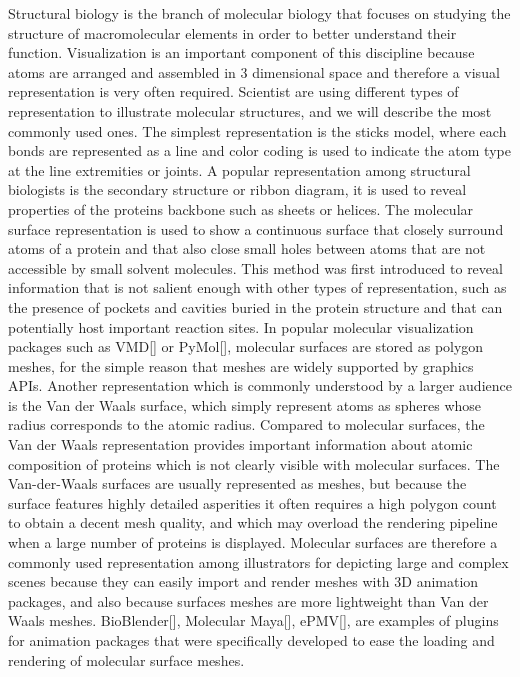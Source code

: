 Structural biology is the branch of molecular biology that focuses on studying the structure of macromolecular elements in order to better understand their function.
Visualization is an important component of this discipline because atoms are arranged and assembled in 3 dimensional space and therefore a visual representation is very often required.
Scientist are using different types of representation to illustrate molecular structures, and we will describe the most commonly used ones.
The simplest representation is the sticks model, where each bonds are represented as a line and color coding is used to indicate the atom type at the line extremities or joints.
A popular representation among structural biologists is the secondary structure or ribbon diagram, it is used to reveal properties of the proteins backbone such as sheets or helices.
The molecular surface representation is used to show a continuous surface that closely surround atoms of a protein and that also close small holes between atoms that are not accessible by small solvent molecules.
This method was first introduced to reveal information that is not salient enough with other types of representation, such as the presence of pockets and cavities buried in the protein structure and that can potentially host important reaction sites.
In popular molecular visualization packages such as VMD[] or PyMol[], molecular surfaces are stored as polygon meshes, for the simple reason that meshes are widely supported by graphics APIs.
Another representation which is commonly understood by a larger audience is the Van der Waals surface, which simply represent atoms as spheres whose radius corresponds to the atomic radius.
Compared to molecular surfaces, the Van der Waals representation provides important information about atomic composition of proteins which is not clearly visible with molecular surfaces.
The Van-der-Waals surfaces are usually represented as meshes, but because the surface features highly detailed asperities it often requires a high polygon count to obtain a decent mesh quality, and which may overload the rendering pipeline when a large number of proteins is displayed.
Molecular surfaces are therefore a commonly used representation among illustrators for depicting large and complex scenes because they can easily import and render meshes with 3D animation packages, and also because surfaces meshes are more lightweight than Van der Waals meshes.
BioBlender[], Molecular Maya[], ePMV[], are examples of plugins for animation packages that were specifically developed to ease the loading and rendering of molecular surface meshes.
